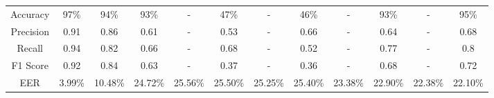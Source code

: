 \documentclass[10pt, journal, anonymous=true]{IEEEtran}
\begin{document}
\begin{table*}[]
{\begin{tabular}{|c|ccc|cc|cc|cc|cc|}
        Accuracy                                 & \multicolumn{1}{c|}{\cellcolor[HTML]{FFFFFF}97\%}   & \multicolumn{1}{c|}{\cellcolor[HTML]{FFFFFF}94\%}    & \cellcolor[HTML]{FFFFFF}93\%    & \multicolumn{1}{c|}{\cellcolor[HTML]{FFFFFF}-}       & \cellcolor[HTML]{FFFFFF}47\%    & \multicolumn{1}{c|}{\cellcolor[HTML]{FFFFFF}-}       & \cellcolor[HTML]{FFFFFF}46\%    & \multicolumn{1}{c|}{\cellcolor[HTML]{FFFFFF}-}       & \cellcolor[HTML]{FFFFFF}93\%    & \multicolumn{1}{c|}{\cellcolor[HTML]{FFFFFF}-}       & \cellcolor[HTML]{FFFFFF}95\%    \\ \cline{1-1}
        Precision                                & \multicolumn{1}{c|}{\cellcolor[HTML]{FFFFFF}0.91}   & \multicolumn{1}{c|}{\cellcolor[HTML]{FFFFFF}0.86}    & \cellcolor[HTML]{FFFFFF}0.61    & \multicolumn{1}{c|}{\cellcolor[HTML]{FFFFFF}-}       & \cellcolor[HTML]{FFFFFF}0.53 & \multicolumn{1}{c|}{\cellcolor[HTML]{FFFFFF}-}       & \cellcolor[HTML]{FFFFFF}0.66 & \multicolumn{1}{c|}{\cellcolor[HTML]{FFFFFF}-}       & \cellcolor[HTML]{FFFFFF}0.64 & \multicolumn{1}{c|}{\cellcolor[HTML]{FFFFFF}-}       & \cellcolor[HTML]{FFFFFF}0.68 \\ \cline{1-1}
        Recall                                   & \multicolumn{1}{c|}{\cellcolor[HTML]{FFFFFF}0.94}   & \multicolumn{1}{c|}{\cellcolor[HTML]{FFFFFF}0.82}    & \cellcolor[HTML]{FFFFFF}0.66    & \multicolumn{1}{c|}{\cellcolor[HTML]{FFFFFF}-}       & \cellcolor[HTML]{FFFFFF}0.68 & \multicolumn{1}{c|}{\cellcolor[HTML]{FFFFFF}-}       & \cellcolor[HTML]{FFFFFF}0.52 & \multicolumn{1}{c|}{\cellcolor[HTML]{FFFFFF}-}       & \cellcolor[HTML]{FFFFFF}0.77 & \multicolumn{1}{c|}{\cellcolor[HTML]{FFFFFF}-}       & \cellcolor[HTML]{FFFFFF}0.8  \\ \cline{1-1}
        F1 Score                                 & \multicolumn{1}{c|}{\cellcolor[HTML]{FFFFFF}0.92}   & \multicolumn{1}{c|}{\cellcolor[HTML]{FFFFFF}0.84}    & \cellcolor[HTML]{FFFFFF}0.63    & \multicolumn{1}{c|}{\cellcolor[HTML]{FFFFFF}-}       & \cellcolor[HTML]{FFFFFF}0.37 & \multicolumn{1}{c|}{\cellcolor[HTML]{FFFFFF}-}       & \cellcolor[HTML]{FFFFFF}0.36 & \multicolumn{1}{c|}{\cellcolor[HTML]{FFFFFF}-}       & \cellcolor[HTML]{FFFFFF}0.68 & \multicolumn{1}{c|}{\cellcolor[HTML]{FFFFFF}-}       & \cellcolor[HTML]{FFFFFF}0.72 \\ \cline{1-1}
        \rowcolor[HTML]{D9D9D9} 
        EER                                      & \multicolumn{1}{c|}{\cellcolor[HTML]{D9D9D9}3.99\%} & \multicolumn{1}{c|}{\cellcolor[HTML]{D9D9D9}10.48\%} & 24.72\%                         & \multicolumn{1}{c|}{\cellcolor[HTML]{D9D9D9}25.56\%} & 25.50\%                      & \multicolumn{1}{c|}{\cellcolor[HTML]{D9D9D9}25.25\%} & 25.40\%                      & \multicolumn{1}{c|}{\cellcolor[HTML]{D9D9D9}23.38\%} & 22.90\%                      & \multicolumn{1}{c|}{\cellcolor[HTML]{D9D9D9}22.38\%} & 22.10\%                      \\ \hline
        \end{tabular}}
\end{table*}
\end{document}
